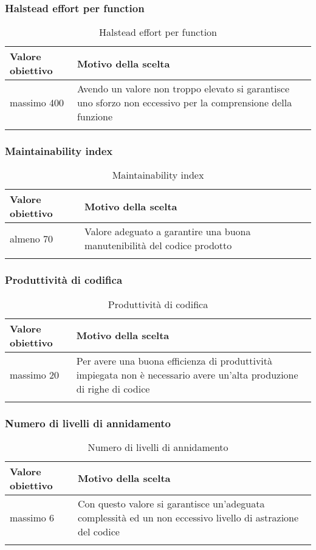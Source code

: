 \documentclass[../PianoDiQualifica.tex]{subfiles}
\begin{document}
		\subsubsection{Halstead effort per function}
			\begin{longtable}[c] { >{\centering\arraybackslash}p{4cm} p{7cm} }
				\toprule
				\centerline{\textbf{Valore obiettivo}} & \centerline{\textbf{Motivo della scelta}} \\
				\midrule
					massimo 400 & Avendo un valore non troppo elevato si garantisce uno sforzo non eccessivo per la comprensione della funzione \\
				\bottomrule
				\caption{Halstead effort per function}
			\end{longtable}
			
		\subsubsection{Maintainability index}
			\begin{longtable}[c] { >{\centering\arraybackslash}p{4cm} p{7cm} }
				\toprule
				\centerline{\textbf{Valore obiettivo}} & \centerline{\textbf{Motivo della scelta}} \\
				\midrule
					almeno 70 &	Valore adeguato a garantire una buona manutenibilità del codice prodotto \\
				\bottomrule
				\caption{Maintainability index}
			\end{longtable}
			
		\subsubsection{Produttività di codifica}
			\begin{longtable}[c] { >{\centering\arraybackslash}p{4cm} p{7cm} }
				\toprule
				\centerline{\textbf{Valore obiettivo}} & \centerline{\textbf{Motivo della scelta}} \\
				\midrule
					massimo 20 & Per avere una buona efficienza di produttività impiegata non è necessario avere un'alta produzione di righe di codice \\
				\bottomrule
				\caption{Produttività di codifica}
			\end{longtable}
			
		\subsubsection{Numero di livelli di annidamento}
			\begin{longtable}[c] { >{\centering\arraybackslash}p{4cm} p{7cm} }
				\toprule
				\centerline{\textbf{Valore obiettivo}} & \centerline{\textbf{Motivo della scelta}} \\
				\midrule
					massimo 6 &	Con questo valore si garantisce un'adeguata complessità ed un non eccessivo livello di astrazione del codice \\
				\bottomrule
				\caption{Numero di livelli di annidamento}
			\end{longtable}
		
\end{document}
